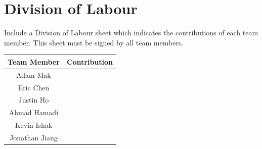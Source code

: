 \documentclass[]{article}
\begin{document}


\appendix
\section{Division of Labour}
\label{sec:division_of_labour}
Include a Division of Labour sheet which indicates the contributions of each team member. This sheet must be signed by all team members.
\begin{center} \begin{tabular} {|c|p{35em}|}
	\hline
	\textbf{Team Member} & \textbf{Contribution} \\
	\hline \hline
	Adam Mak &  \\
	\hline
	Eric Chen &  \\
	\hline
	Justin Ho &  \\
	\hline
	Ahmad Hamadi &  \\
	\hline
	Kevin Ishak &  \\
	\hline
	Jonathan Jiang &  \\
	\hline
\end{tabular} \end{center}

\end{document}
